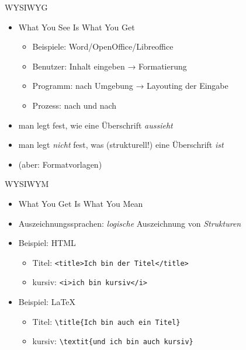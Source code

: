 \begin{frame}{WYSIWYG}

\begin{itemize}
\itemsep1pt\parskip0pt
\item
  What You See Is What You Get

  \begin{itemize}
  \itemsep1pt\parskip0pt
  \item
    Beispiele: Word/OpenOffice/Libreoffice
  \item
    Benutzer: Inhalt eingeben → Formatierung
  \item
    Programm: nach Umgebung → Layouting der Eingabe
  \item
    Prozess: nach und nach
  \end{itemize}
\item
  man legt fest, wie eine Überschrift \emph{aussieht}
\item
  man legt \emph{nicht} fest, was (strukturell!) eine Überschrift
  \emph{ist}
\item
  (aber: Formatvorlagen)
\end{itemize}

\end{frame}

\begin{frame}{WYSIWYM}

\begin{itemize}
\itemsep1pt\parskip0pt
\item
  What You Get Is What You Mean
\item
  Auszeichnungssprachen: \emph{logische} Auszeichnung von
  \emph{Strukturen}
\item
  Beispiel: HTML

  \begin{itemize}
  \itemsep1pt\parskip0pt
  \item
    Titel:
    \texttt{\textless{}title\textgreater{}Ich\ bin\ der\ Titel\textless{}/title\textgreater{}}
  \item
    kursiv:
    \texttt{\textless{}i\textgreater{}ich\ bin\ kursiv\textless{}/i\textgreater{}}
  \end{itemize}
\item
  Beispiel: \LaTeX
  \begin{itemize}
  \itemsep1pt\parskip0pt
   \item 
    Titel:
    \texttt{\textbackslash{}title\{Ich\ bin\ auch\ ein\ Titel\}}
  \item
    kursiv:
    \texttt{\textbackslash{}textit\{und\ ich\ bin\ auch\ kursiv\}}
  \end{itemize}
\end{itemize}

\end{frame}

